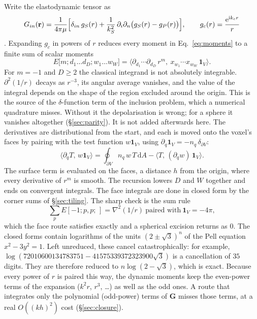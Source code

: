 \documentclass[preprint,review,12pt]{elsarticle}
\newcommand{\bG}{\mathbf{G}}
\newcommand{\dd}{\mathrm{d}}
\begin{document}
Write the elastodynamic tensor as
\begin{equation}\label{eq:Gdecomp}
  G_{in}(\mathbf r)=\frac{1}{4\pi\mu}\Bigl[\delta_{in}\,g_{S}(r)
  +\frac{1}{k_S^2}\,\partial_i\partial_n\bigl(g_S(r)-g_P(r)\bigr)\Bigr],
  \qquad g_{c}(r)=\frac{\mathrm{e}^{\mathrm{i}k_cr}}{r}
\end{equation}
\citep{Kupradze1963,Aki2002}. Expanding $g_c$ in powers of $r$ reduces every moment in
Eq.~\eqref{eq:moments} to a finite sum of scalar moments
\begin{equation}\label{eq:Emoment}
  E\bigl[m;d_1\ldots d_D;w_1\ldots w_W\bigr]
  =\bigl\langle \partial_{d_1}\!\cdots\partial_{d_D}\,r^m,\ x_{w_1}\!\cdots x_{w_W}\,\mathbf 1_V\bigr\rangle .
\end{equation}
For $m=-1$ and $D\ge2$ the classical integrand is not absolutely integrable. $\partial^2(1/r)$
decays as $r^{-3}$, its angular average vanishes, and the value of the integral depends on the
shape of the region excluded around the origin. This is the source of the $\delta$-function term
of the inclusion problem, which a numerical quadrature misses. Without it the depolarisation is
wrong; for a sphere it vanishes altogether (\S\ref{sec:parity}). It is not added afterwards here. The derivatives are
distributional from the start, and each is moved onto the voxel's faces by pairing with the test
function $w\mathbf 1_V$, using $\partial_q\mathbf 1_V=-n_q\,\delta_{\partial V}$:
\begin{equation}\label{eq:peel}
  \bigl\langle \partial_qT,\,w\mathbf 1_V\bigr\rangle
  =\oint_{\partial V} n_q\,w\,T\,\dd A-\bigl\langle T,\,(\partial_qw)\,\mathbf 1_V\bigr\rangle .
\end{equation}
The surface term is evaluated on the faces, a distance $h$ from the origin, where every
derivative of $r^m$ is smooth. The recursion lowers $D$ and $W$ together and ends on convergent
integrals. The face integrals are done in closed form by the corner sums of \S\ref{sec:tiling}. The
sharp check is the sum rule
\begin{equation}\label{eq:sumrule}
  \textstyle\sum_pE[-1;p,p;\,]=\nabla^2(1/r)\ \text{paired with}\ \mathbf 1_V=-4\pi ,
\end{equation}
which the face route satisfies exactly and a spherical excision returns as $0$. The closed forms
contain logarithms of the units $(2\pm\sqrt3)^n$ of the Pell equation $x^2-3y^2=1$. Left
unreduced, these cancel catastrophically: for example, $\log(72010600134783751-41575339372323900\sqrt3)$
is a cancellation of $35$ digits. They are therefore reduced to $n\log(2-\sqrt3)$, which is
exact. Because every power of $r$ is paired this way, the dynamic moments keep the even-power terms
of the expansion ($k^2r$, $r^3$, \dots) as well as the odd ones. A route that integrates only the
polynomial (odd-power) terms of $\bG$ misses those terms, at a real $O((kh)^2)$ cost
(\S\ref{sec:closure}).
\end{document}
